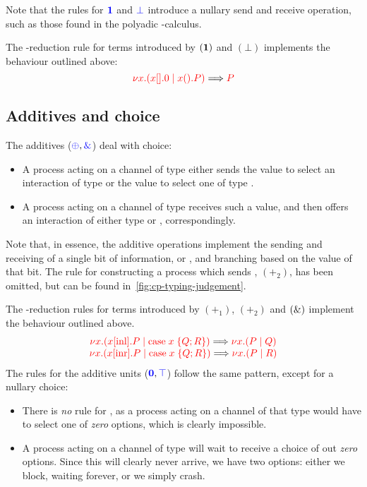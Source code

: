 Note that the rules for $\textcolor{blue}{\mathbf{1}}$ and $\textcolor{blue}{\bot}$ introduce a nullary send and
receive operation, such as those found in the polyadic \textpi-calculus.
\begin{center}
  \cpInfOne
  \cpInfBot
\end{center}
The \textbeta-reduction rule for terms introduced by $(\mathbf{1})$ and $(\bot)$
implements the behaviour outlined above:
\[
  \textcolor{red}{\nu x.(x[].0 \mid x().P)}
  \Longrightarrow
  \textcolor{red}{P}
\]

\subsection{Additives and choice}
\label{sec:cp-additives}
The additives ($\textcolor{blue}{\oplus}, \textcolor{blue}{\mathbin{\text{\&}}}$) deal with choice:
\begin{itemize}
\item
  A process acting on a channel of type  either sends the value
   to select an interaction of type  or the value  to
  select one of type .
\item
  A process acting on a channel of type  receives such a value,
  and then offers an interaction of either type  or ,
  correspondingly.
\end{itemize}
Note that, in essence, the additive operations implement the sending and
receiving of a single bit of information,  or , and branching
based on the value of that bit.
The rule for constructing a process which sends , $(\plus_2)$, has been
omitted, but can be found in~\cref{fig:cp-typing-judgement}.
\begin{center}
  \cpInfWith
\end{center}
The \textbeta-reduction rules for terms introduced by $(\plus_1)$, $(\plus_2)$
and $(\mathbin{\text{\&}})$ implement the behaviour outlined above.
\[
  \begin{array}{c}
    \textcolor{red}{\nu x.(x[\text{inl}].P \mid \text{case}\;x\;\{Q;R\})} \Longrightarrow \textcolor{red}{\nu x.(P \mid Q)}
    \\
    \textcolor{red}{\nu x.(x[\text{inr}].P \mid \text{case}\;x\;\{Q;R\})} \Longrightarrow \textcolor{red}{\nu x.(P \mid R)}
  \end{array}
\]
%
The rules for the additive units ($\textcolor{blue}{\mathbf{0}}, \textcolor{blue}{\top}$) follow the same
pattern, except for a nullary choice:
\begin{itemize}
\item
  There is \emph{no} rule for \ty{\nil}, as a process acting on a channel of
  that type would have to select one of \emph{zero} options, which is clearly
  impossible.
\item
  A process acting on a channel of type \ty{\top} will wait to receive a choice
  of out \emph{zero} options. Since this will clearly never arrive, we have two
  options: either we block, waiting forever, or we simply crash.
\end{itemize}
